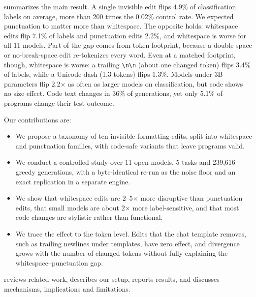  summarizes the main result.
A single invisible edit flips 4.9\% of classification labels on average, more than 200 times the 0.02\% control rate.
We expected punctuation to matter more than whitespace. The opposite holds: whitespace edits flip 7.1\% of labels and punctuation edits 2.2\%, and whitespace is worse for all 11 models.
Part of the gap comes from token footprint, because a double-space or no-break-space edit re-tokenizes every word. Even at a matched footprint, though, whitespace is worse: a trailing \texttt{\textbackslash n\textbackslash n} (about one changed token) flips 3.4\% of labels, while a Unicode dash (1.3 tokens) flips 1.3\%.
Models under 3B parameters flip 2.2$\times$ as often as larger models on classification, but code shows no size effect.
Code text changes in 36\% of generations, yet only 5.1\% of programs change their test outcome.

Our contributions are:
\begin{itemize}[leftmargin=*,itemsep=0pt,topsep=0pt]
    \item We propose a taxonomy of ten invisible formatting edits, split into whitespace and punctuation families, with code-safe variants that leave programs valid.
    \item We conduct a controlled study over 11 open models, 5 tasks and 239,616 greedy generations, with a byte-identical re-run as the noise floor and an exact replication in a separate engine.
    \item We show that whitespace edits are 2--5$\times$ more disruptive than punctuation edits, that small models are about 2$\times$ more label-sensitive, and that most code changes are stylistic rather than functional.
    \item We trace the effect to the token level. Edits that the chat template removes, such as trailing newlines under \llama templates, have zero effect, and divergence grows with the number of changed tokens without fully explaining the whitespace--punctuation gap.
\end{itemize}

 reviews related work,  describes our setup,  reports results, and  discusses mechanisms, implications and limitations.
